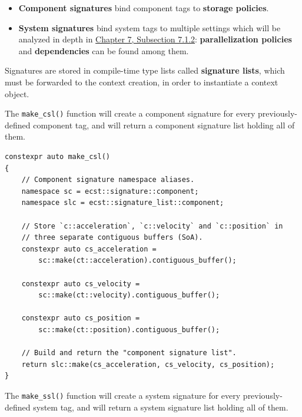 \documentclass[oneside, 12pt, a4paper, openany]{book}
\begin{document}
\begin{itemize}
\item
  \textbf{Component signatures} bind component tags to \textbf{storage
  policies}.
\item
  \textbf{System signatures} bind system tags to multiple settings which
  will be analyzed in depth in \protect\hyperlink{system_sigs}{Chapter
  7, Subsection 7.1.2}: \textbf{parallelization policies} and
  \textbf{dependencies} can be found among them.
\end{itemize}

Signatures are stored in compile-time type lists called
\textbf{signature lists}, which must be forwarded to the context
creation, in order to instantiate a context object.

The
\texttt{make_csl()}
function will create a component signature for every previously-defined
component tag, and will return a component signature list holding all of
them.

\begin{verbatim}
constexpr auto make_csl()
{
    // Component signature namespace aliases.
    namespace sc = ecst::signature::component;
    namespace slc = ecst::signature_list::component;

    // Store `c::acceleration`, `c::velocity` and `c::position` in
    // three separate contiguous buffers (SoA).
    constexpr auto cs_acceleration =
        sc::make(ct::acceleration).contiguous_buffer();

    constexpr auto cs_velocity =
        sc::make(ct::velocity).contiguous_buffer();

    constexpr auto cs_position =
        sc::make(ct::position).contiguous_buffer();

    // Build and return the "component signature list".
    return slc::make(cs_acceleration, cs_velocity, cs_position);
}
\end{verbatim}

The
\texttt{make_ssl()}
function will create a system signature for every previously-defined
system tag, and will return a system signature list holding all of them.
\end{document}
